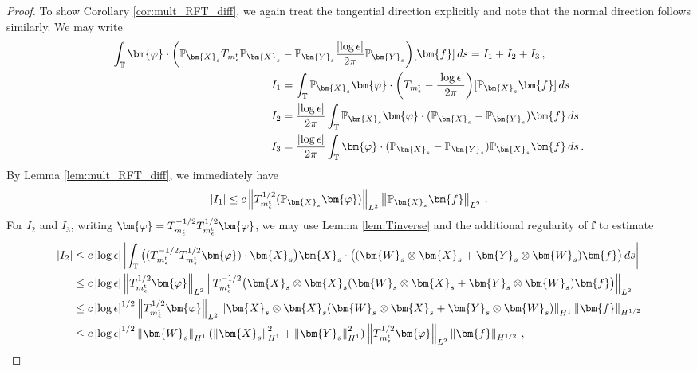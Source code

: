 \documentclass[11pt,reqno]{amsart}
\newcommand{\T}{\mathbb{T}}
\renewcommand{\P}{\mathbb{P}}
\newcommand{\X}{\bm{X}}
\newcommand{\Y}{\bm{Y}}
\newcommand{\abs}[1]{\left\lvert #1 \right\rvert}
\newcommand{\norm}[1]{\left\lVert #1 \right\rVert}
\numberwithin{equation}{section}
\theoremstyle{definition}
\begin{document}
\begin{proof}
To show Corollary \ref{cor:mult_RFT_diff}, we again treat the tangential direction explicitly and note that the normal direction follows similarly. We may write
\begin{equation} 
\begin{aligned}
  \int_\T\bm{\varphi}\cdot\bigg(\P_{\X_s} T_{m_\epsilon^{\rm t}}\P_{\X_s}& -\P_{\Y_s}\frac{\abs{\log\epsilon}}{2\pi}\P_{\Y_s}\bigg)[\bm{f}]\,ds = I_1+I_2+I_3\,,\\
  I_1 &= \int_\T \P_{\X_s}\bm{\varphi}\cdot\bigg(T_{m_\epsilon^{\rm t}}-\frac{\abs{\log\epsilon}}{2\pi}\bigg)[\P_{\X_s}\bm{f}]\,ds\\
  I_2 &= \frac{\abs{\log\epsilon}}{2\pi}\int_\T\P_{\X_s}\bm{\varphi}\cdot (\P_{\X_s}-\P_{\Y_s})\bm{f}\,ds \\
  I_3 &= \frac{\abs{\log\epsilon}}{2\pi}\int_\T\bm{\varphi}\cdot(\P_{\X_s}-\P_{\Y_s})\P_{\X_s}\bm{f}\,ds \,.
\end{aligned}
\end{equation}
%
%
By Lemma \ref{lem:mult_RFT_diff}, we immediately have
\begin{equation}
  \abs{I_1}\le c\norm{T_{m_\epsilon^{\rm t}}^{1/2}(\P_{\X_s}\bm{\varphi})}_{L^2}\norm{\P_{\X_s}\bm{f}}_{L^2}\,.
\end{equation}
%
%
For $I_2$ and $I_3$, writing $\bm{\varphi}=T_{m_\epsilon^{\rm t}}^{-1/2}T_{m_\epsilon^{\rm t}}^{1/2}\bm{\varphi}$, we may use Lemma \ref{lem:Tinverse} and the additional regularity of $\bm{f}$ to estimate  
\begin{equation}
\begin{aligned}
  \abs{I_2} 
  &\le c\abs{\log\epsilon}\abs{\int_\T \big((T_{m_\epsilon^{\rm t}}^{-1/2}T_{m_\epsilon^{\rm t}}^{1/2}\bm{\varphi})\cdot\X_s\big)\X_s\cdot\big((\bm{W}_s\otimes\X_s+\Y_s\otimes\bm{W}_s)\bm{f}\big)\,ds } \\
  &\le c\abs{\log\epsilon}\norm{T_{m_\epsilon^{\rm t}}^{1/2}\bm{\varphi}}_{L^2}\norm{T_{m_\epsilon^{\rm t}}^{-1/2}\big(\X_s\otimes\X_s(\bm{W}_s\otimes\X_s+\Y_s\otimes\bm{W}_s)\bm{f}\big)}_{L^2}\\
  &\le c\abs{\log\epsilon}^{1/2}\norm{T_{m_\epsilon^{\rm t}}^{1/2}\bm{\varphi}}_{L^2}\norm{\X_s\otimes\X_s(\bm{W}_s\otimes\X_s+\Y_s\otimes\bm{W}_s)}_{H^1}\norm{\bm{f}}_{H^{1/2}}\\
  &\le c\abs{\log\epsilon}^{1/2}\norm{\bm{W}_s}_{H^1}(\norm{\X_s}_{H^1}^2+\norm{\Y_s}_{H^1}^2)\norm{T_{m_\epsilon^{\rm t}}^{1/2}\bm{\varphi}}_{L^2}\norm{\bm{f}}_{H^{1/2}}\,,
\end{aligned}
\end{equation}

\end{proof}
\end{document}
